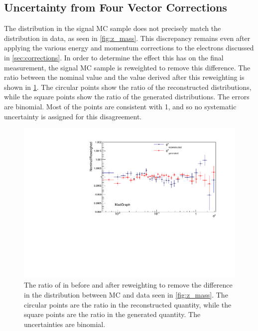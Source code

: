 \subsection{Uncertainty from Four Vector Corrections}
\label{four_vector_uncertainty}

The \mee distribution in the \MADGRAPH signal MC sample does not precisely
match the distribution in data, as seen in \cref{fig:z_mass}. This
discrepancy remains even after applying the various energy and momentum
corrections to the electrons discussed in \cref{sec:corrections}. In order
to determine the effect this has on the final measurement, the \MADGRAPH signal
MC sample is reweighted to remove this difference. The ratio between the
nominal \phistar value and the value derived after this reweighting is shown in
\cref{fig:z_mass_reweighted}. The circular points show the ratio of the
reconstructed \phistar distributions, while the square points show the ratio of
the generated \phistar distributions. The errors are binomial. Most of the
points are consistent with \num{1}, and so no systematic uncertainty is
assigned for this disagreement.

\begin{figure}[!htbp]
    \centering
    \includegraphics[width=\textwidth]{figures/ZMass_reweighed.pdf}
    \caption[
        The ratio of \phistar in \MADGRAPH before and after reweighting to
        remove the difference in the \mee distribution between MC and data.
    ]{
        The ratio of \phistar in \MADGRAPH before and after reweighting to
        remove the difference in the \mee distribution between MC and data seen
        in \cref{fig:z_mass}. The circular points are the ratio in the
        reconstructed quantity, while the square points are the ratio in the
        generated quantity. The uncertainties are binomial.
    }
    \label{fig:z_mass_reweighted}
\end{figure}

